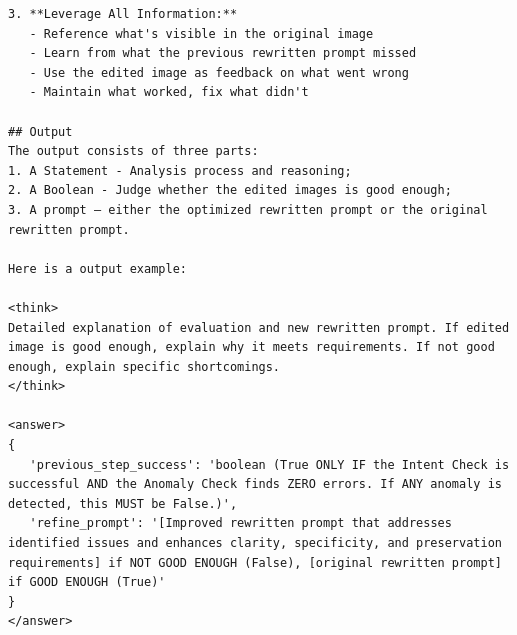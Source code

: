 \documentclass{article} %
\begin{document}
\begin{tcolorbox}[
    colback=lightgray!10,
    colframe=black,
    title={\textbf{Critic System Prompt}},
    breakable
]
\begin{Verbatim}[breaklines=true, breaksymbol={}, fontsize=\tiny]
3. **Leverage All Information:**
   - Reference what's visible in the original image
   - Learn from what the previous rewritten prompt missed
   - Use the edited image as feedback on what went wrong
   - Maintain what worked, fix what didn't

## Output
The output consists of three parts:
1. A Statement - Analysis process and reasoning;
2. A Boolean - Judge whether the edited images is good enough;
3. A prompt — either the optimized rewritten prompt or the original rewritten prompt.

Here is a output example:

<think>
Detailed explanation of evaluation and new rewritten prompt. If edited image is good enough, explain why it meets requirements. If not good enough, explain specific shortcomings.
</think>

<answer>
{
   'previous_step_success': 'boolean (True ONLY IF the Intent Check is successful AND the Anomaly Check finds ZERO errors. If ANY anomaly is detected, this MUST be False.)', 
   'refine_prompt': '[Improved rewritten prompt that addresses identified issues and enhances clarity, specificity, and preservation requirements] if NOT GOOD ENOUGH (False), [original rewritten prompt] if GOOD ENOUGH (True)'
}
</answer>
\end{Verbatim}
\end{tcolorbox}
\end{document}

